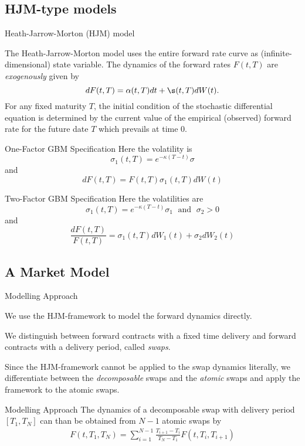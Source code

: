
\subsection{HJM-type models}

{ Heath-Jarrow-Morton (HJM) model}

The Heath-Jarrow-Morton model uses the entire forward rate curve as
(infinite-dimensional) state variable. The dynamics of the forward rates $F(t,T)$ are {\it exogenously} given by
$$
dF(t,T) = \alpha(t,T) dt + \s(t,T) dW(t).
$$
For any fixed maturity $T$, the
initial condition of the stochastic differential equation
is determined by the current value
of the empirical (observed) forward rate for the future date $T$
which prevails at time $0$.

{One-Factor GBM Specification}
Here the volatility is
$$
\sigma_1(t,T)=e^{-\kappa (T-t)}\sigma
$$
and
$$
dF(t,T)=F(t,T)\sigma_1(t,T)dW(t)
$$

{Two-Factor GBM Specification}
Here the volatilities are
$$
\sigma_1(t,T)=e^{-\kappa (T-t)}\sigma_1 \; \mbox{ and } \; \sigma_2>0
$$
and
$$
\frac{dF(t,T)}{F(t,T)}=\sigma_1(t,T)dW_1(t)+\sigma_2dW_2(t)
$$

\subsection{A Market Model}

{Modelling Approach}


	We use the HJM-framework to model the forward dynamics directly.

	We distinguish between forward contracts with a fixed time delivery and forward contracts with a delivery period, called \emph{swaps}.

	Since the HJM-framework cannot be applied to the swap dynamics literally, we differentiate between the \emph{decomposable} swaps and the \emph{atomic} swaps and apply the framework to the atomic swaps.


{Modelling Approach}
The dynamics of a decomposable swap with delivery period $[T_1,T_{N}]$ can than be obtained from $N-1$ atomic swaps by
\begin{align}
F(t,T_1,T_N)=\sum\limits_{i=1}^{N-1} \frac{T_{i+1}-T_i}{T_N-T_1} F(t,T_i,T_{i+1})\label{eqn: decomposbale swap}
\end{align}


